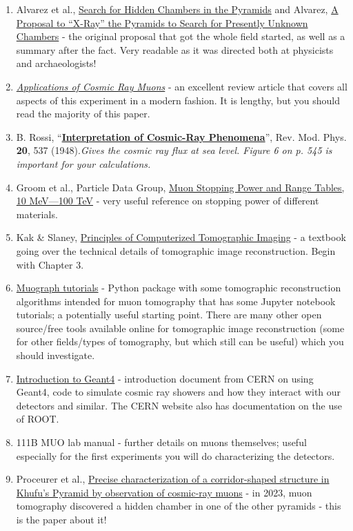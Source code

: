 \documentclass{../lab}
\begin{document}
\begin{enumerate}
    \item Alvarez et al., \href{https://www2.lns.mit.edu/fisherp/AlvarezPyramids.pdf}{Search for Hidden Chambers in the Pyramids} and Alvarez, \href{https://drive.google.com/file/d/1A4hww35SFvV6_HgJBxH6QwkU2P4GFEW0/view?usp=sharing}{A Proposal to ``X-Ray'' the Pyramids to Search for Presently Unknown Chambers} - the original proposal that got the whole field started, as well as a summary after the fact. Very readable as it was directed both at physicists and archaeologists!
    \item \href{https://www.sciencedirect.com/science/article/pii/S0146641020300156}{\textit{Applications of Cosmic Ray Muons}} - an excellent review article that covers all aspects of this experiment in a modern fashion. It is lengthy, but you should read the majority of this paper.
    \item B. Rossi, ``\href{https://drive.google.com/file/d/1tFUQJkkIA-OwbRkS-L1pOJuPoD6z67KY/view?usp=drive_link}{\textbf{Interpretation of Cosmic-Ray Phenomena}}'', Rev. Mod. Phys. \textbf{20}, 537 (1948).\emph{Gives the cosmic ray flux at sea level. Figure 6 on p. 545 is important for your calculations.}
    \item Groom et al., Particle Data Group, \href{https://pdg.lbl.gov/2014/AtomicNuclearProperties/adndt.pdf}{Muon Stopping Power and Range Tables, 10 MeV—100 TeV} - very useful reference on stopping power of different materials.
    \item Kak \& Slaney, \href{https://www.slaney.org/pct/pct-toc.html}{Principles of Computerized Tomographic Imaging} - a textbook going over the technical details of tomographic image reconstruction. Begin with Chapter 3.
    \item \href{https://github.com/MaximeLagrange/muograph/tree/main/tutorials}{Muograph tutorials} - Python package with some tomographic reconstruction algorithms intended for muon tomography that has some Jupyter notebook tutorials; a potentially useful starting point. There are many other open source/free tools available online for tomographic image reconstruction (some for other fields/types of tomography, but which still can be useful) which you should investigate.
    \item \href{https://geant4-userdoc.web.cern.ch/UsersGuides/IntroductionToGeant4/html/index.html}{Introduction to Geant4} - introduction document from CERN on using Geant4, code to simulate cosmic ray showers and how they interact with our detectors and similar. The CERN website also has documentation on the use of ROOT.
    \item 111B MUO lab manual - further details on muons themselves; useful especially for the first experiments you will do characterizing the detectors.
    \item Proceurer et al., \href{https://pmc.ncbi.nlm.nih.gov/articles/PMC9981702/}{Precise characterization of a corridor-shaped structure in Khufu’s Pyramid by observation of cosmic-ray muons} - in 2023, muon tomography discovered a hidden chamber in one of the other pyramids - this is the paper about it!
\end{enumerate}
\end{document}
